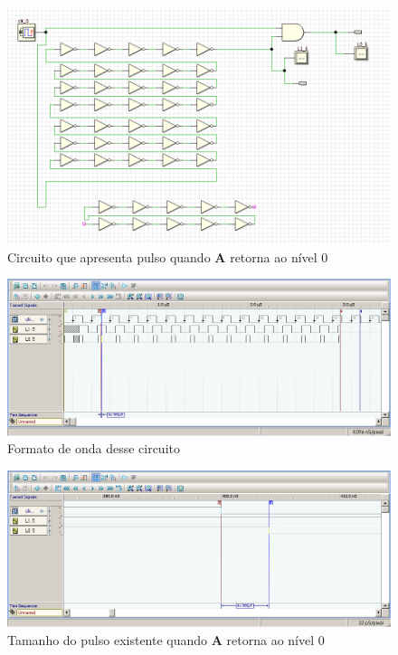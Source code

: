 \documentclass[12pt]{article}
\begin{document}
\begin{figure}[H]
    \centering
    \includegraphics[width=.9\textwidth]{Exp04/exp4_2.0_d_clk_circuito_ao_voltar_para_zero.png}
    \caption{Circuito que apresenta pulso quando \textbf{A} retorna ao nível 0}\label{fig:exp4_2.0_d_clk_circuito_ao_voltar_para_zero.png}
\end{figure}

\begin{figure}[H]
    \centering
    \includegraphics[width=.9\textwidth]{Exp04/exp4_2.0_d_clk_wave_ao_voltar_para_zero.png}
    \caption{Formato de onda desse circuito}\label{fig:exp4_2.0_d_clk_wave_ao_voltar_para_zero.png}
\end{figure}

\begin{figure}[H]
    \centering
    \includegraphics[width=.9\textwidth]{Exp04/exp4_2.0_d_clk_wave_lenght_ao_voltar_para_zero.png}
    \caption{Tamanho do pulso existente quando \textbf{A} retorna ao nível 0}\label{fig:exp4_2.0_d_clk_wave_lenght_ao_voltar_para_zero.png}
\end{figure}
\end{document}
